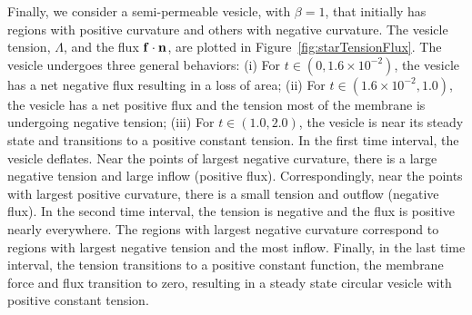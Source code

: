 \documentclass[9pt,twocolumn,twoside,lineno]{pnas-new}
\begin{document}
Finally, we consider a semi-permeable vesicle, with $\beta=1$, that
initially has regions with positive curvature and others with negative
curvature. The vesicle tension, $\Lambda$, and the flux $\mathbf{f} \cdot \mathbf{n}$,
are plotted in Figure~\ref{fig:starTensionFlux}. The vesicle undergoes
three general behaviors: (i) For $t \in (0,1.6 \times 10^{-2})$, the
vesicle has a net negative flux resulting in a loss of area; (ii) For $t
\in (1.6 \times 10^{-2},1.0)$, the vesicle has a net positive flux and
the tension most of the membrane is undergoing negative tension; (iii)
For $t \in (1.0,2.0)$, the vesicle is near its steady state and
transitions to a positive constant tension. In the first time interval,
the vesicle deflates. Near the points of largest negative curvature,
there is a large negative tension and large inflow (positive flux).
Correspondingly, near the points with largest positive curvature, there
is a small tension and outflow (negative flux). In the second time
interval, the tension is negative and the flux is positive nearly
everywhere. The regions with largest negative curvature correspond to
regions with largest negative tension and the most inflow. Finally, in
the last time interval, the tension transitions to a positive constant
function, the membrane force and flux transition to zero, resulting in a
steady state circular vesicle with positive constant tension.
\end{document}
